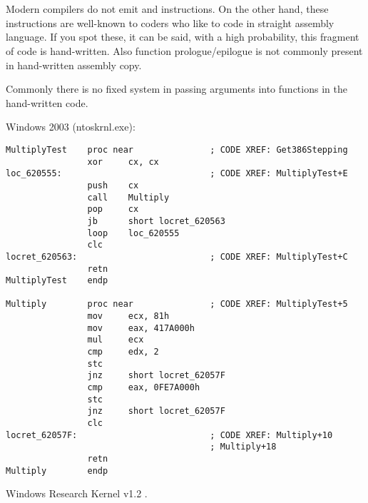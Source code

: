 ﻿\section{}

\subsection{}

{Modern compilers do not emit  and  instructions.
On the other hand, these instructions are well-known to coders who like to code in straight assembly language.
If you spot these, it can be said, with a high probability, this fragment of code is hand-written.
Also function prologue/epilogue is not commonly present in hand-written assembly copy.}

{Commonly there is no fixed system in passing arguments into functions in the hand-written
code}.

 Windows 2003 
(ntoskrnl.exe):

\begin{lstlisting}
MultiplyTest    proc near               ; CODE XREF: Get386Stepping
                xor     cx, cx
loc_620555:                             ; CODE XREF: MultiplyTest+E
                push    cx
                call    Multiply
                pop     cx
                jb      short locret_620563
                loop    loc_620555
                clc
locret_620563:                          ; CODE XREF: MultiplyTest+C
                retn
MultiplyTest    endp

Multiply        proc near               ; CODE XREF: MultiplyTest+5
                mov     ecx, 81h
                mov     eax, 417A000h
                mul     ecx
                cmp     edx, 2
                stc
                jnz     short locret_62057F
                cmp     eax, 0FE7A000h
                stc
                jnz     short locret_62057F
                clc
locret_62057F:                          ; CODE XREF: Multiply+10
                                        ; Multiply+18
                retn
Multiply        endp
\end{lstlisting}

Windows Research Kernel v1.2 
.
